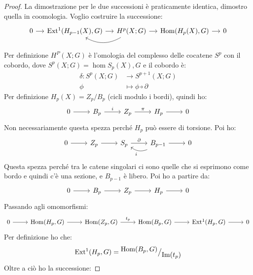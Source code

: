 \begin{proof}
  La dimostrazione per le due successioni è praticamente identica, dimostro quella in coomologia.
  Voglio costruire la successione:
  \[
    \begin{tikzcd}[nodes = {column sep = 12 pt}]
      0 \rar & \ext{H_{p-1}(X), G} \rar & \arrow[bend left]{l}{} H^p(X;G) \rar & \hom{H_p(X), G} \rar & 0
    \end{tikzcd}
  \]
  Per definizione $ H^P(X;G) $ è l'omologia del complesso delle cocatene $ S^p $ con il cobordo,
  dove $ S^p(X;G) = \hom{S_p(X), G} $ e il cobordo è:
  \begin{align*}
    \delta \colon S^p(X;G) & \to S^{p+1}(X;G) \\
    \phi & \mapsto \phi \circ \partial
  \end{align*}
  Per definizione $ H_p(X) = Z_p \slash B_p $ (cicli modulo i bordi), quindi ho:
  \[
    \begin{tikzcd}
      0 \rar & B_p \rar{i} & Z_p \rar{\pi} & H_p \rar & 0
    \end{tikzcd}
  \]
  Non necessariamente questa spezza perché $ H_p $ può essere di torsione.
  Poi ho:
  \[
    \begin{tikzcd}
      0 \rar & Z_p \rar & S_p \rar{\partial} & \arrow[bend left]{l}{i} B_{p-1} \rar & 0
    \end{tikzcd}
  \]
  Questa spezza perché tra le catene singolari ci sono quelle che si esprimono
  come bordo e quindi c'è una sezione, e $ B_{p-1} $ è libero.
  Poi ho a partire da:
  \[
    \begin{tikzcd}
      0 \rar & B_p \rar & Z_p \rar & H_p \rar & 0
    \end{tikzcd}
  \]
  Passando agli omomorfismi:
  \[
    \begin{tikzcd}
      0 \rar & \hom{H_p, G} \rar & \hom{Z_p, G} \rar{t_p} & \hom{B_p, G} \rar & \ext{H_p, G} \rar & 0
    \end{tikzcd}
  \]
  Per definizione ho che:
  \[
    \mathrm{Ext^1}( H_p,G) = {^{\textstyle \mathrm{Hom}( B_p,G)}\big/_{\textstyle \mathrm{Im}( t_p )}}
  \]
  Oltre a ciò ho la successione:

\end{proof}
